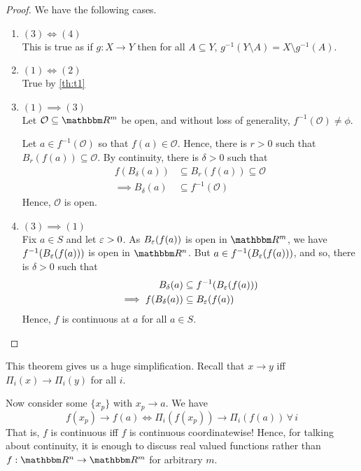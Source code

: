 \documentclass[Analysis-3]{subfiles}
\begin{document}
\begin{proof} We have the following cases.
  \begin{enumerate}[label = $\bullet$]
    \item $ (3) \iff (4) $\\
          This is true as if $ g: X \to Y $ then for all $ A \subseteq Y $, $ g^{-1}(Y \setminus A) = X \setminus g^{-1}(A) $.
    \item $ (1) \iff (2) $\\
          True by \ref{th:t1}

    \item $ (1) \implies (3) $\\
          Let $ \mathcal O \subseteq \R^m $ be open, and without loss of generality, $ f^{-1}(\mathcal O) \neq \phi $.

          Let $ a \in f^{-1}(\mathcal{O}) $ so that $ f(a) \in \mathcal O $. Hence, there is $ r > 0 $ such that $ B_r(f(a)) \subseteq \mathcal O $. By continuity, there is $ \delta > 0 $ such that
          \begin{align*}
            f(B_\delta(a))       & \subseteq B_r(f(a)) \subseteq \mathcal O \\
            \implies B_\delta(a) & \subseteq f^{-1}(\mathcal{O})
          \end{align*}
          Hence, $ \mathcal O $ is open.

    \item $ (3) \implies (1) $\\
          Fix $ a \in S $ and let $ \varepsilon > 0 $. As $ B_\varepsilon(f(a)) $ is open in $ \R^m $, we have $ f^{-1}(B_\varepsilon(f(a))) $ is open in $ \R^n $. But $ a \in f^{-1}(B_\varepsilon(f(a))) $, and so, there is $ \delta > 0 $ such that
          \begin{align*}
            B_\delta(a)             & \subseteq f^{-1}(B_\varepsilon(f(a))) \\
            \implies f(B_\delta(a)) & \subseteq B_\varepsilon(f(a))
          \end{align*}
          Hence, $ f $ is continuous at $ a $ for all $ a \in S $.
  \end{enumerate}
\end{proof}

This theorem gives us a huge simplification. Recall that $ x \longrightarrow y $ iff $ \Pi_i(x) \longrightarrow \Pi_i(y) $ for all $ i $.

Now consider some $ \{x_p\} $ with $ x_p \longrightarrow a $. We have
\[ f(x_p) \longrightarrow f(a) \iff \Pi_i(f(x_p)) \longrightarrow \Pi_i(f(a)) \, \forall \, i  \]
That is, $ f $ is continuous iff $ f $ is continuous coordinatewise! Hence, for talking about continuity, it is enough to discuss real valued functions rather than $ f: \R^n \to \R^m $ for arbitrary $ m $.
\pagebreak
\end{document}
